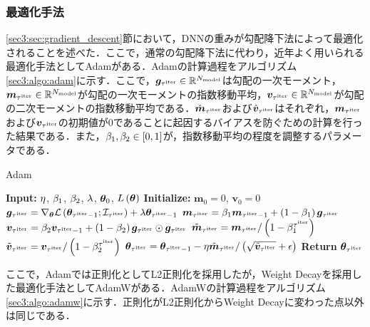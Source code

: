 \documentclass[12pt]{jarticle}
\numberwithin{equation}{section}    %
\numberwithin{figure}{section}      %
\numberwithin{table}{section}      %
\begin{document}
\subsubsection{最適化手法}
\label{sec3:sec:optimizer}
\ref{sec3:sec:gradient_descent}節において，DNNの重みが勾配降下法によって最適化されることを述べた．ここで，通常の勾配降下法に代わり，近年よく用いられる最適化手法としてAdam\cite{kingma2014adam}がある．Adamの計算過程をアルゴリズム\ref{sec3:algo:adam}に示す．ここで，$\bm{g}_{\tau^{\text{iter}}} \in \mathbb{R}^{N_{\text{model}}}$は勾配の一次モーメント，$\bm{m}_{\tau^{\text{iter}}} \in \mathbb{R}^{N_{\text{model}}}$が勾配の一次モーメントの指数移動平均，$\bm{v}_{\tau^{\text{iter}}} \in \mathbb{R}^{N_{\text{model}}}$が勾配の二次モーメントの指数移動平均である．$\hat{\bm{m}}_{\tau^{\text{iter}}}$および$\hat{\bm{v}}_{\tau^{\text{iter}}}$はそれぞれ，$\bm{m}_{\tau^{\text{iter}}}$および$\bm{v}_{\tau^{\text{iter}}}$の初期値が0であることに起因するバイアスを防ぐための計算を行った結果である．また，$\beta_{1}, \beta_{2} \in \left[0, 1\right]$が，指数移動平均の程度を調整するパラメータである．
\begin{algorithm}
    \caption{Adam}
    \label{sec3:algo:adam}
    \begin{algorithmic}[1]
        \State \textbf{Input:} $\eta$, $\beta_{1}$, $\beta_{2}$, $\lambda$, $\bm{\theta}_{0}$, $L\left(\bm{\theta}\right)$
        \State \textbf{Initialize:} $\bm{m}_{0} = 0$, $\bm{v}_{0} = 0$
        \State $\bm{g}_{\tau^{\text{iter}}} = \nabla_{\bm{\theta}} \mathcal{L}\left(\bm{\theta}_{\tau^{\text{iter}} - 1}; \mathcal{I}_{\tau^{\text{iter}}}\right) + \lambda \bm{\theta}_{\tau^{\text{iter}}-1}$
        \State $\bm{m}_{\tau^{\text{iter}}} = \beta_{1} \bm{m}_{\tau^{\text{iter}}-1} + \left(1 - \beta_{1}\right) \bm{g}_{\tau^{\text{iter}}}$
        \State $\bm{v}_{\tau^{\text{iter}}} = \beta_{2} \bm{v}_{\tau^{\text{iter}}-1} + \left(1 - \beta_{2}\right) \bm{g}_{\tau^{\text{iter}}} \odot \bm{g}_{\tau^{\text{iter}}}$
        \State $\tilde{\bm{m}}_{\tau^{\text{iter}}} = \bm{m}_{\tau^{\text{iter}}} / \left(1 - \beta_{1}^{\tau^{\text{iter}}}\right)$
        \State $\tilde{\bm{v}}_{\tau^{\text{iter}}} = \bm{v}_{\tau^{\text{iter}}} / \left(1 - \beta_{2}^{\tau^{\text{iter}}}\right)$
        \State $\bm{\theta}_{\tau^{\text{iter}}} = \bm{\theta}_{\tau^{\text{iter}}-1} - \eta \tilde{\bm{m}}_{\tau^{\text{iter}}} / \left(\sqrt{\tilde{\bm{v}}_{\tau^{\text{iter}}}} + \epsilon\right)$
        \EndFor
        \State \textbf{Return} $\bm{\theta}_{\tau^{\text{iter}}}$
    \end{algorithmic}
\end{algorithm}
ここで，Adamでは正則化としてL2正則化を採用したが，Weight Decayを採用した最適化手法としてAdamW\cite{loshchilov2017decoupled}がある．AdamWの計算過程をアルゴリズム\ref{sec3:algo:adamw}に示す．正則化がL2正則化からWeight Decayに変わった点以外は同じである．
\end{document}
